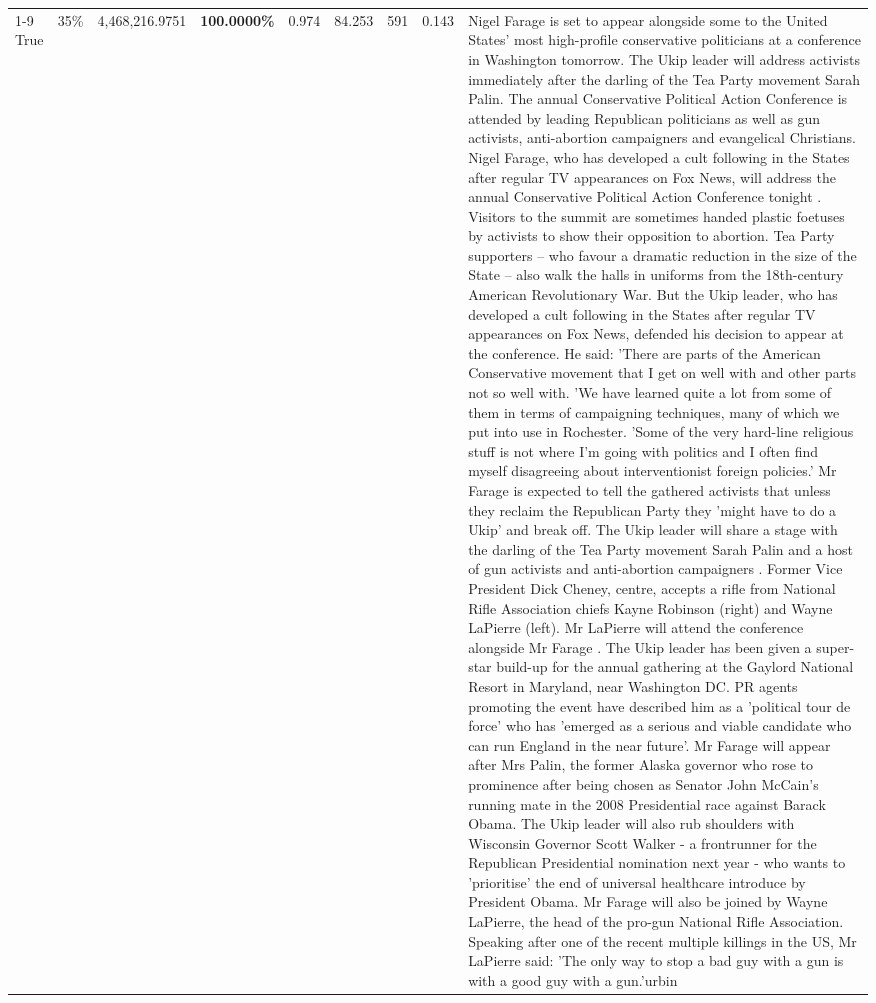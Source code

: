 \begin{table}[H]
\begin{tabular}{lllrlllll}
\cline{1-9} \cline{2-9}
True & 35\% & 4,468,216.9751 & \bfseries \color{red} 100.0000\% & 0.974 & 84.253 & 591 & 0.143 & Nigel Farage is set to appear alongside some to the United States' most high-profile conservative politicians at a conference in Washington tomorrow. The Ukip leader will address activists immediately after the darling of the Tea Party movement Sarah Palin. The annual Conservative Political Action Conference is attended by leading Republican politicians as well as gun activists, anti-abortion campaigners and evangelical Christians. Nigel Farage, who has developed a cult following in the States after regular TV appearances on Fox News, will address the annual Conservative Political Action Conference tonight . Visitors to the summit are sometimes handed plastic foetuses by activists to show their opposition to abortion. Tea Party supporters – who favour a dramatic reduction in the size of the State – also walk the halls in uniforms from the 18th-century American Revolutionary War. But the Ukip leader, who has developed a cult following in the States after regular TV appearances on Fox News, defended his decision to appear at the conference. He said: 'There are parts of the American Conservative movement that I get on well with and other parts not so well with. 'We have learned quite a lot from some of them in terms of campaigning techniques, many of which we put into use in Rochester. 'Some of the very hard-line religious stuff is not where I'm going with politics and I often find myself disagreeing about interventionist foreign policies.' Mr Farage is expected to tell the gathered activists that unless they reclaim the Republican Party they 'might have to do a Ukip' and break off. The Ukip leader will share a stage with the darling of the Tea Party movement Sarah Palin and a host of gun activists and anti-abortion campaigners . Former Vice President Dick Cheney, centre, accepts a rifle from National Rifle Association chiefs Kayne Robinson (right) and Wayne LaPierre (left). Mr LaPierre will attend the conference alongside Mr Farage . The Ukip leader has been given a super-star build-up for the annual gathering at the Gaylord National Resort in Maryland, near Washington DC. PR agents promoting the event have described him as a 'political tour de force' who has 'emerged as a serious and viable candidate who can run England in the near future'. Mr Farage will appear after Mrs Palin, the former Alaska governor who rose to prominence after being chosen as Senator John McCain's running mate in the 2008 Presidential race against Barack Obama. The Ukip leader will also rub shoulders with Wisconsin Governor Scott Walker - a frontrunner for the Republican Presidential nomination next year - who wants to 'prioritise' the end of universal healthcare introduce by President Obama. Mr Farage will also be joined by Wayne LaPierre, the head of the pro-gun National Rifle Association. Speaking after one of the recent multiple killings in the US, Mr LaPierre said: 'The only way to stop a bad guy with a gun is with a good guy with a gun.'urbin \\

\end{tabular}
\end{table}
